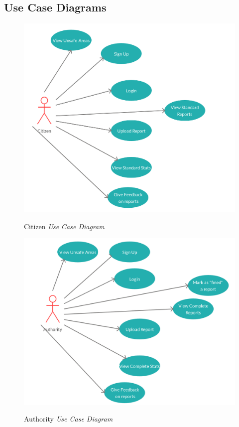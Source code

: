 \documentclass[../RASD.tex]{subfiles}
\begin{document}
            \subsection{Use Case Diagrams}\label{subsec:Use-case-diagrams}
                    \begin{figure}[H]
                        \centering
                        \includegraphics[scale = 1]{assets/citizenUC.png}\\[1.6 cm]
                        \caption[Citizen \textit{Use Case Diagram}]{Citizen \textit{Use Case Diagram}}
                    \end{figure}
                    \begin{figure}[H]
                        \centering
                        \includegraphics[scale = 1]{assets/authorityUC.png}\\[1.6 cm]
                        \caption[Authority \textit{Use Case Diagram}]{Authority \textit{Use Case Diagram}}
                    \end{figure}
\end{document}
